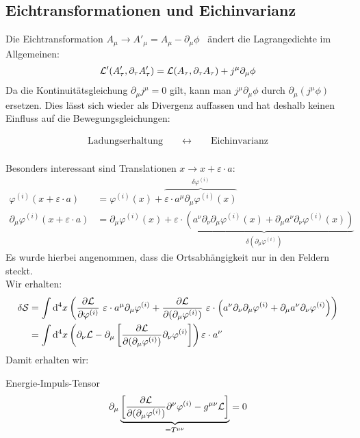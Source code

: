 \subsection{Eichtransformationen und Eichinvarianz}
Die Eichtransformation $A_{\mu} \rightarrow A'_{\mu} = A_{\mu} - \partial_{\mu}\phi$ \ ändert die Lagrangedichte im Allgemeinen:
\begin{align}
\mathcal{L}'(A'_{\tau},\partial_{\tau}A'_{\tau}) = \mathcal{L}(A_{\tau},\partial_{\tau}A_{\tau})+ j^{\mu}\partial_{\mu}\phi
\end{align}
Da die Kontinuitätsgleichung $\partial_{\mu}j^{\mu}=0$ gilt, kann man $j^{\mu}\partial_{\mu}\phi$ durch $\partial_{\mu}(j^{\mu}\phi)$ ersetzen.
Dies lässt sich wieder als Divergenz auffassen und hat deshalb keinen Einfluss auf die Bewegungsgleichungen:

\begin{align*}
\text{Ladungserhaltung} \qquad \longleftrightarrow \qquad \text{Eichinvarianz}
\end{align*}
\\
Besonders interessant sind Translationen $x \rightarrow x + \varepsilon \cdot a$: 
\begin{align*}
\varphi^{(i)}(x + \varepsilon \cdot a) &= \varphi^{(i)}(x) + \overbrace{\varepsilon\cdot a^{\mu}\partial_{\mu}\varphi^{(i)}(x)}^{\delta\varphi^{(i)}} \\
\partial_{\mu}\varphi^{(i)}(x + \varepsilon \cdot a) &= \partial_{\mu}\varphi^{(i)}(x) + \underbrace{\varepsilon\cdot\left(a^{\nu}\partial_{\nu}\partial_{\mu}\varphi^{(i)}(x) + \partial_{\mu}a^{\nu}\partial_{\nu}\varphi^{(i)}(x)\right)}_{\delta(\partial_{\mu}\varphi^{(i)})} 
\end{align*}
Es wurde hierbei angenommen, dass die Ortsabhängigkeit nur in den Feldern steckt. \\
Wir erhalten:
\begin{align*}
\delta \mathcal{S} &= \int \dd[4]{x} \left( \dphi \ \varepsilon\cdot a^{\mu}\partial_{\mu}\varphi^{(i)} + \ddphi \ \varepsilon\cdot\left(a^{\nu}\partial_{\nu}\partial_{\mu}\varphi^{(i)}+\partial_{\mu}a^{\nu}\partial_{\nu}\varphi^{(i)}\right) \right) \\
&= \int \dd[4]{x} \left( \partial_{\nu}\lagr - \partial_{\mu} \left[\ddphi \partial_{\nu}\varphi^{(i)}\right] \right) \varepsilon\cdot a^{\nu}
\end{align*}
Damit erhalten wir:
\begin{mybox}{Energie-Impuls-Tensor}
\begin{align}
\partial_{\mu}\underbrace{\left[ \frac{\partial\mathcal{L}}{\partial(\partial_{\mu}\varphi^{(i)})} \partial^{\nu}\varphi^{(i)} - g^{\mu \nu}\mathcal{L} \right]}_{ = T^{\mu\nu}} = 0
\end{align}
\end{mybox}

